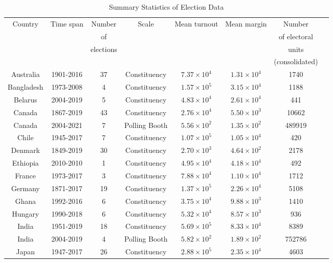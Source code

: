 \begin{table}[h]
\centering
\caption{Summary Statistics of Election Data}
\label{tab:election_stats}
\begin{tabular}{|c|c|c|c|c|c|c|c|}
\hline
Country & Time span & Number & Scale    & Mean turnout & Mean margin  & Number \\ 
 &  & of  &  &  &  & of electoral \\ 
 &  & elections  &  &  &  & units \\ 
 &  &  &  &  &  & (consolidated) \\ \hline
Australia & 1901-2016 & 37 & Constituency & $7.37\times 10^{4}$ & $1.31\times 10^{4}$ & 1740\\ \hline
Bangladesh & 1973-2008 & 4 & Constituency & $1.57\times 10^{5}$ & $3.15\times 10^{4}$ & 1188\\ \hline
Belarus & 2004-2019 & 5 & Constituency & $4.83\times 10^{4}$ & $2.61\times 10^{4}$ & 441\\ \hline
Canada & 1867-2019 & 43 & Constituency & $2.76\times 10^{4}$ & $5.50\times 10^{3}$ & 10662\\ \hline
Canada & 2004-2021 & 7 & Polling Booth & $5.56\times 10^{2}$ & $1.35\times 10^{2}$ & 489919\\ \hline
Chile & 1945-2017 & 7 & Constituency & $1.07\times 10^{5}$ & $1.05\times 10^{4}$ & 420\\ \hline
Denmark & 1849-2019 & 30 & Constituency & $2.70\times 10^{3}$ & $4.64\times 10^{2}$ & 2178\\ \hline
Ethiopia & 2010-2010 & 1 & Constituency & $4.95\times 10^{4}$ & $4.18\times 10^{4}$ & 492\\ \hline
France & 1973-2017 & 3 & Constituency & $7.88\times 10^{4}$ & $1.10\times 10^{4}$ & 1712\\ \hline
Germany & 1871-2017 & 19 & Constituency & $1.37\times 10^{5}$ & $2.26\times 10^{4}$ & 5108\\ \hline
Ghana & 1992-2016 & 6 & Constituency & $3.75\times 10^{4}$ & $9.88\times 10^{3}$ & 1410\\ \hline
Hungary & 1990-2018 & 6 & Constituency & $5.32\times 10^{4}$ & $8.57\times 10^{3}$ & 936\\ \hline
India & 1951-2019 & 18 & Constituency & $5.69\times 10^{5}$ & $8.33\times 10^{4}$ & 8389\\ \hline
India & 2004-2019 & 4 & Polling Booth & $5.82\times 10^{2}$ & $1.89\times 10^{2}$ & 752786\\ \hline
Japan & 1947-2017 & 26 & Constituency & $2.88\times 10^{5}$ & $2.35\times 10^{4}$ & 4603\\ \hline

\end{tabular}
\end{table}

